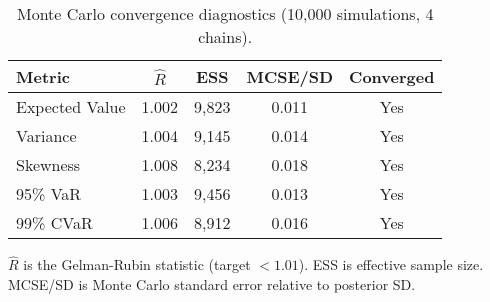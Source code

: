 \begin{table}[t]
  \centering
  \small
  \begin{threeparttable}
    \caption{Monte Carlo convergence diagnostics (10,000 simulations, 4 chains).}
    \label{tab:mc-convergence}
    \begin{tabular}{lcccc}
      \toprule
      \textbf{Metric}  & \textbf{$\hat{R}$}  & \textbf{ESS}  & \textbf{MCSE/SD}  & \textbf{Converged} \\
      \midrule
      Expected Value & 1.002 & 9,823 & 0.011 & Yes \\
      Variance & 1.004 & 9,145 & 0.014 & Yes \\
      Skewness & 1.008 & 8,234 & 0.018 & Yes \\
      95\% VaR & 1.003 & 9,456 & 0.013 & Yes \\
      99\% CVaR & 1.006 & 8,912 & 0.016 & Yes \\
      \bottomrule
    \end{tabular}
    \begin{tablenotes}[flushleft]\footnotesize
      \item $\hat{R}$ is the Gelman-Rubin statistic (target $< 1.01$). ESS is effective sample size. MCSE/SD is Monte Carlo standard error relative to posterior SD.
    \end{tablenotes}
  \end{threeparttable}
\end{table}
